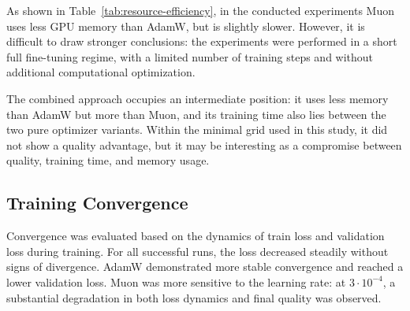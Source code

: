 \documentclass{article}
\begin{document}
\begin{table}[ht]
\centering
{}
\caption{Training time, maximum memory usage, and final quality.}
\label{tab:resource-efficiency}
\end{table}

As shown in Table~\ref{tab:resource-efficiency}, in the conducted experiments Muon uses less GPU memory than AdamW, but is slightly slower. However, it is difficult to draw stronger conclusions: the experiments were performed in a short full fine-tuning regime, with a limited number of training steps and without additional computational optimization.

The combined approach occupies an intermediate position: it uses less memory than AdamW but more than Muon, and its training time also lies between the two pure optimizer variants. Within the minimal grid used in this study, it did not show a quality advantage, but it may be interesting as a compromise between quality, training time, and memory usage.

\subsection{Training Convergence}

Convergence was evaluated based on the dynamics of train loss and validation loss during training.
For all successful runs, the loss decreased steadily without signs of divergence.
AdamW demonstrated more stable convergence and reached a lower validation loss.
Muon was more sensitive to the learning rate: at $3 \cdot 10^{-4}$, a substantial degradation in both loss dynamics and final quality was observed.
\end{document}
